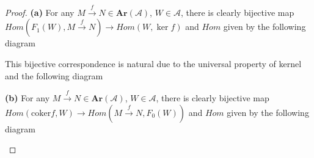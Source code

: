 \documentclass[../main.tex]{subfiles}
\begin{document}
\begin{proof}
\textbf{(a) }For any $M\xrightarrow{f}N\in\mathbf{Ar}(\mathscr A)$, $W\in\mathscr A$, there is clearly bijective map $Hom(F_1(W),M\xrightarrow{f}N)\to Hom(W,\ker f)$ and $Hom$ given by the following diagram
\begin{center}
\end{center}
This bijective correspondence is natural due to the universal property of kernel and the following diagram
\begin{center}
\end{center}
\textbf{(b) }For any $M\xrightarrow{f}N\in\mathbf{Ar}(\mathscr A)$, $W\in\mathscr A$, there is clearly bijective map $Hom(\mathrm{coker} f,W)\to Hom(M\xrightarrow{f}N,F_0(W))$ and $Hom$ given by the following diagram
\begin{center}
\end{center}
\end{proof}
\end{document}
